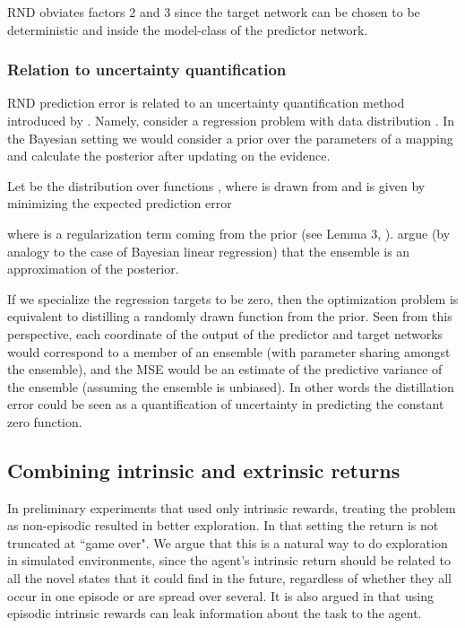 \documentclass{article} \usepackage[dvipsnames]{xcolor}
\begin{document}
RND obviates factors 2 and 3 since the target network can be chosen to be deterministic and inside the model-class of the predictor network.

\subsubsection{Relation to uncertainty quantification}
RND prediction error is related to an uncertainty quantification method introduced by \cite{osband2018randomized}. Namely, consider a regression problem with data distribution . In the Bayesian setting we would consider a prior  over the parameters of a mapping  and calculate the posterior after updating on the evidence. 

Let  be the distribution over functions , where  is drawn from  and  is given by minimizing the expected prediction error 

where  is a regularization term coming from the prior (see Lemma 3, \cite{osband2018randomized}).
\citet{osband2018randomized} argue (by analogy to the case of Bayesian linear regression) that the ensemble  is an approximation of the posterior.

If we specialize the regression targets  to be zero, then the optimization problem  is equivalent to distilling a randomly drawn function from the prior. Seen from this perspective, each coordinate of the output of the predictor and target networks would correspond to a member of an ensemble (with parameter sharing amongst the ensemble), and the MSE would be an estimate of the predictive variance of the ensemble (assuming the ensemble is unbiased). In other words the distillation error could be seen as a quantification of uncertainty in predicting the constant zero function.

\subsection{Combining intrinsic and extrinsic returns}
\label{sec:methods_two_heads}
In preliminary experiments that used only intrinsic rewards, treating the problem as non-episodic resulted in better exploration. In that setting the return is not truncated at ``game over". We argue that this is a natural way to do exploration in simulated environments, since the agent's intrinsic return should be related to all the novel states that it could find in the future, regardless of whether they all occur in one episode or are spread over several. It is also argued in \citep{burda18largescale} that using episodic intrinsic rewards can leak information about the task to the agent.
\end{document}
